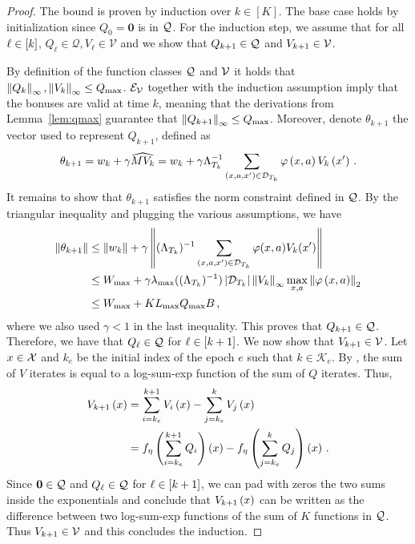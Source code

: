 \begin{proof}
    The bound is proven by induction over $k \in [K]$. The base case holds by initialization since $Q_0 = \mathbf{0}$ is in $\mathcal{Q}$. For the induction step, we assume that for all $\ell \in \left[ k \right]$, $Q_\ell \in \mathcal{Q}, V_\ell \in \mathcal{V}$ and we show that $Q_{k+1} \in \mathcal{Q}$ and $V_{k+1} \in \mathcal{V}$.
    
    By definition of the function classes $\mathcal{Q}$ and $\mathcal{V}$ it holds that $\left\|Q_k\right\|_{\infty}, \left\|V_k\right\|_\infty \leq Q_{\max}$. $\mathcal{E}_{\mathcal{V}}$ together with the induction assumption imply that the bonuses are valid at time $k$, meaning that the derivations from Lemma~\ref{lem:qmax} guarantee that $\left\|Q_{k+1}\right\|_\infty \leq Q_{\max}$. Moreover, denote $\theta_{k+1}$ the vector used to represent $Q_{k+1}$, defined as
    \begin{align*}
        \theta_{k+1} = w_k + \gamma \widehat{M V_k} = w_k + \gamma \Lambda_{T_k}^{-1} \sum_{\left( x, a, x' \right) \in \mathcal{D}_{T_k}} \varphi \left( x, a \right) V_k \left( x' \right)\,.
    \end{align*}
    It remains to show that $\theta_{k+1}$ satisfies the norm constraint defined in $\mathcal{Q}$. By the triangular inequality and plugging the various assumptions, we have
    \begin{align*}
        \left\|\theta_{k+1}\right\| &\leq \left\|w_{k}\right\| + \gamma \left\|(\Lambda_{T_k})^{-1}\sum_{(x,a,x')\in \mathcal{D}_{T_k}} \varphi(x,a) V_k (x')\right\| \\
        &\leq W_{\max} + \gamma \lambda_{\max}((\Lambda_{T_k})^{-1}) \left|\mathcal{D}_{T_k}\right| \left\|V_k\right\|_\infty \max_{x, a} \left\|\varphi \left( x, a \right)\right\|_2 \\
        &\leq W_{\max} + K L_{\max}Q_{\max} B\,,
    \end{align*}
    where we also used $\gamma < 1$ in the last inequality. This proves that $Q_{k+1} \in \mathcal{Q}$. Therefore, we have that $Q_\ell \in \mathcal{Q}$ for $\ell \in \left[ k+1 \right]$. We now show that $V_{k+1} \in \mathcal{V}$. Let $x \in \mathcal{X}$ and $k_e$ be the initial index of the epoch $e$ such that $k \in \mathcal{K}_e$. By \citealp[Lemma~C.1]{MN23}, the sum of $V$ iterates is equal to a log-sum-exp function of the sum of $Q$ iterates. Thus,
    \begin{align*}
        V_{k+1} \left( x \right) &= \sum_{i=k_e}^{k+1} V_i \left( x \right) - \sum_{j=k_e}^k V_j \left( x \right) \\
        &= f_\eta \left( \sum_{i=k_e}^{k+1} Q_i \right) \left( x \right) - f_\eta \left( \sum_{j=k_e}^k Q_j \right) \left( x \right)\,.
    \end{align*}
    Since $\mathbf{0} \in \mathcal{Q}$ and $Q_\ell \in \mathcal{Q}$ for $\ell \in \left[ k+1 \right]$, we can pad with zeros the two sums inside the exponentials and conclude that $V_{k+1} \left( x \right)$ can be written as the difference between two log-sum-exp functions of the sum of $K$ functions in $\mathcal{Q}$. Thus $V_{k+1} \in \mathcal{V}$ and this concludes the induction.
\end{proof}


